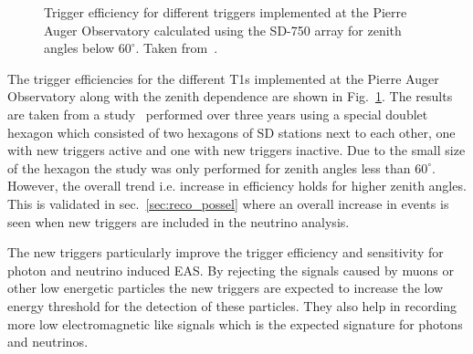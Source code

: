 \begin{figure}[t!]
  \centering
  \hfill
  \caption{Trigger efficiency for different triggers implemented at the Pierre Auger Observatory calculated using the SD-750 array for zenith angles below $60^{\circ}$. Taken from~\cite{gap_note_2017}.}
  \label{fig:Trigger_eff_infill}
\end{figure}

The trigger efficiencies for the different T1s implemented at the Pierre Auger Observatory along with the zenith dependence are shown in Fig.~\ref{fig:Trigger_eff_infill}. The results are taken from a study~\cite{gap_note_2017} performed over three years using a special doublet hexagon which consisted of two hexagons of SD stations next to each other, one with new triggers active and one with new triggers inactive. Due to the small size of the hexagon the study was only performed for zenith angles less than $60^{\circ}$. However, the overall trend i.e. increase in efficiency holds for higher zenith angles. This is validated in sec.~\ref{sec:reco_possel} where an overall increase in events is seen when new triggers are included in the neutrino analysis.

The new triggers particularly improve the trigger efficiency and sensitivity for photon and neutrino induced EAS. By rejecting the signals caused by muons or other low energetic particles the new triggers are expected to increase the low energy threshold for the detection of these particles. They also help in recording more low electromagnetic like signals which is the expected signature for photons and neutrinos. 

